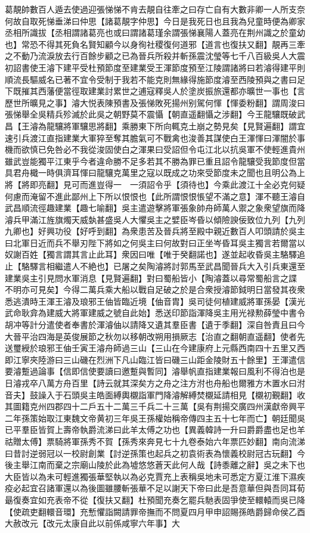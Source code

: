 葛靚帥數百人遁去使過迎張悌悌不肯去靚自往牽之曰存亡自有大數非卿一人所支奈何故自取死悌垂涕曰仲思【諸葛靚字仲思】今日是我死日也且我為兒童時便為卿家丞相所識拔【丞相謂諸葛亮也或曰謂諸葛瑾余謂張悌襄陽人蓋亮在荆州識之於童幼也】常恐不得其死負名賢知顧今以身徇社稷復何道邪【道言也復扶又翻】靚再三牽之不動乃流淚放去行百餘步顧之已為晉兵所殺并斬孫震沈瑩等七千八百級吳人大震初詔書使王濬下建平受杜預節度至建業受王渾節度預至江陵謂諸將曰若濬得建平則順流長驅威名已著不宜令受制于我若不能克則無緣得施節度濬至西陵預與之書曰足下既摧其西藩便當徑取建業討累世之逋寇釋吳人於塗炭振旅還都亦曠世一事也【言歷世所曠見之事】濬大悦表陳預書及張悌敗死揚州别駕何惲【惲委粉翻】謂周浚曰張悌舉全吳精兵殄滅於此吳之朝野莫不震懾【朝直遥翻懾之涉翻】今王龍驤既破武昌【王濬為龍驤將軍驤思將翻】乘勝東下所向輒克土崩之勢見矣【見賢遍翻】謂宜速引兵渡江直指建業大軍猝至奪其膽氣可不戰禽也浚善其謀使白王渾惲曰渾闇於事機而欲慎已免咎必不我從浚固使白之渾果曰受詔但令屯江北以抗吳軍不使輕進貴州雖武豈能獨平江東乎今者違命勝不足多若其不勝為罪已重且詔令龍驤受我節度但當具君舟檝一時俱濟耳惲曰龍驤克萬里之寇以既成之功來受節度未之聞也且明公為上將【將即亮翻】見可而進豈得一　一須詔令乎【須待也】今乘此渡江十全必克何疑何慮而淹留不進此鄙州上下所以恨恨也【此所謂恨恨悵望不滿之意】渾不聽王濬自武昌順流徑趣建業【趣七喻翻】吳主遣遊擊將軍張象帥舟師萬人禦之象衆望旗而降濬兵甲滿江旌旗燭天威埶甚盛吳人大懼吳主之嬖臣岑昏以傾險諛佞致位九列【九列九卿也】好興功役【好呼到翻】為衆患苦及晉兵將至殿中親近數百人叩頭請於吳主曰北軍日近而兵不舉刃陛下將如之何吳主曰何故對曰正坐岑昏耳吳主獨言若爾當以奴謝百姓【獨言謂其言止此耳】衆因曰唯【唯于癸翻諾也】遂並起收昏吳主駱驛追止【駱驛言相繼遣人不絶也】已屠之矣陶濬將討郭馬至武昌聞晉兵大入引兵東還至建業吳主引見問水軍消息【見賢遍翻】對曰蜀船皆小【陶濬蓋以尋常蜀船言之諜不明亦可見矣】今得二萬兵乘大船以戰自足破之於是合衆授濬節鉞明日當發其夜衆悉逃潰時王渾王濬及琅邪王伷皆臨近境【伷音胄】吳司徒何植建威將軍孫晏【漢光武命耿弇為建威大將軍建威之號自此始】悉送印節詣渾降吳主用光禄勲薛瑩中書令胡冲等計分遣使者奉書於渾濬伷以請降又遺其羣臣書【遺于季翻】深自咎責且曰今大晉平治四海是英俊展節之秋勿以移朝改朔用損厥志【治直之翻朝直遥翻】使者先送璽綬於琅邪王伷壬寅王濬舟師過三山【三山在今建康府上元縣西南四十五里又西即江寧夾陸游曰三山磯在烈洲下凡山臨江皆曰磯三山距金陵財五十餘里】王渾遣信要濬蹔過論事【信即信使要讀曰邀蹔與暫同】濬舉帆直指建業報曰風利不得泊也是日濬戎卒八萬方舟百里【詩云就其深矣方之舟之注方泭也舟船也爾雅方木置水曰泭音夫】鼓譟入于石頭吳主皓面縛輿櫬詣軍門降濬解縛焚櫬延請相見【櫬初覲翻】收其圖籍克州四郡四十二戶五十二萬三千兵二十三萬【吳有荆揚交廣四州漢獻帝興平二年孫策始取江東魏文帝黄初三年吳王孫權始稱帝傳四主五十七年而亡】朝廷聞吳已平羣臣皆賀上壽帝執爵流涕曰此羊太傅之功也【異義韓詩一升曰爵爵盡也足也羊祜贈太傅】票騎將軍孫秀不賀【孫秀來奔見七十九卷泰始六年票匹妙翻】南向流涕曰昔討逆弱冠以一校尉創業【討逆孫策也起兵之初袁術表為懷義校尉冠古玩翻】今後主舉江南而棄之宗廟山陵於此為墟悠悠蒼天此何人哉【詩黍離之辭】吳之未下也大臣皆以為未可輕進獨張華堅執以為必克賈充上表稱吳地未可悉定方夏江淮下濕疾疫必起宜召諸軍還以為後圖雖腰斬張華不足以謝天下帝曰此是吾意華但與吾同耳荀朂復奏宜如充表帝不從【復扶又翻】杜預聞充奏乞罷兵馳表固爭使至轘轅而吳已降【使疏吏翻轘音環】充慙懼詣闕請罪帝撫而不問夏四月甲申詔賜孫皓爵歸命侯乙酉大赦改元【改元太康自此以前係咸寧六年事】大